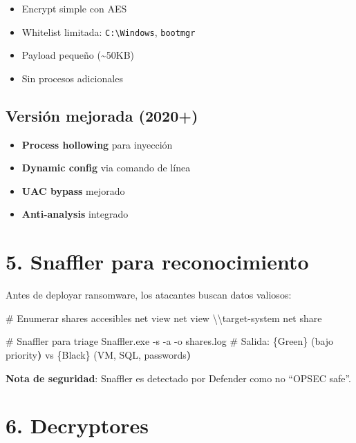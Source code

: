\documentclass[
  letterpaper,
]{report}
\newenvironment{Shaded}{\begin{snugshade}}{\end{snugshade}}
\newcommand{\AttributeTok}[1]{\textcolor[rgb]{0.40,0.45,0.13}{#1}}
\newcommand{\KeywordTok}[1]{\textcolor[rgb]{0.00,0.23,0.31}{\textbf{#1}}}
\newcommand{\NormalTok}[1]{\textcolor[rgb]{0.00,0.23,0.31}{#1}}
\providecommand{\tightlist}{%
  \setlength{\itemsep}{0pt}\setlength{\parskip}{0pt}}
\begin{document}
\begin{itemize}
\tightlist
\item
  Encrypt simple con AES
\item
  Whitelist limitada: \texttt{C:\textbackslash{}Windows},
  \texttt{bootmgr}
\item
  Payload pequeño (\textasciitilde50KB)
\item
  Sin procesos adicionales
\end{itemize}

\subsection{Versión mejorada (2020+)}\label{versiuxf3n-mejorada-2020}

\begin{itemize}
\tightlist
\item
  \textbf{Process hollowing} para inyección
\item
  \textbf{Dynamic config} via comando de línea
\item
  \textbf{UAC bypass} mejorado
\item
  \textbf{Anti-analysis} integrado
\end{itemize}

\section{5. Snaffler para
reconocimiento}\label{snaffler-para-reconocimiento}

Antes de deployar ransomware, los atacantes buscan datos valiosos:

\begin{Shaded}
\begin{Highlighting}[]
\NormalTok{\# Enumerar shares accesibles}
\NormalTok{net view}
\NormalTok{net view \textbackslash{}\textbackslash{}target{-}system}
\NormalTok{net share}

\NormalTok{\# Snaffler para triage}
\NormalTok{Snaffler.exe }\AttributeTok{{-}s} \AttributeTok{{-}a} \AttributeTok{{-}o}\NormalTok{ shares.log}
\NormalTok{\# Salida: \{Green\} (bajo priority}\KeywordTok{)}\NormalTok{ vs \{Black\} (VM, SQL, passwords}\KeywordTok{)}
\end{Highlighting}
\end{Shaded}

\textbf{Nota de seguridad}: Snaffler es detectado por Defender como no
``OPSEC safe''.

\section{6. Decryptores}\label{decryptores}
\end{document}

